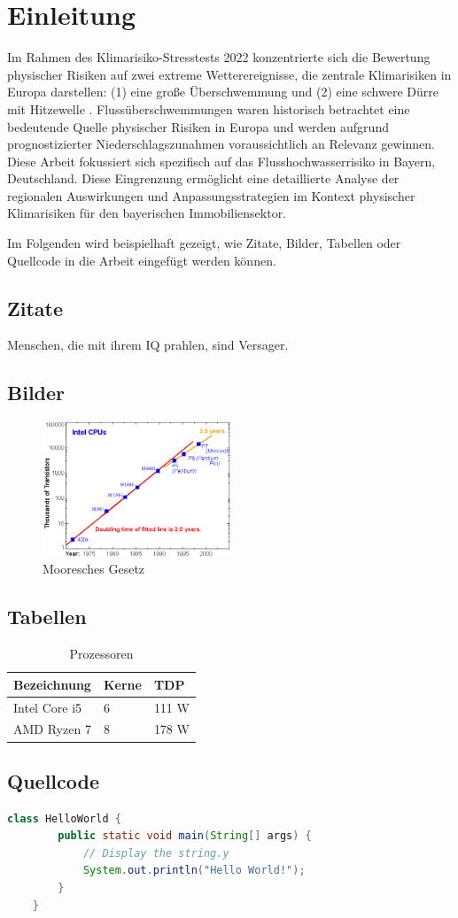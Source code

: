 \section{Einleitung}

Im Rahmen des Klimarisiko-Stresstests 2022 konzentrierte sich die Bewertung physischer Risiken auf zwei extreme Wetterereignisse, die zentrale Klimarisiken in Europa darstellen: (1) eine große Überschwemmung und (2) eine schwere Dürre mit Hitzewelle \parencite{ECB2022ClimateStressTest}. Flussüberschwemmungen waren historisch betrachtet eine bedeutende Quelle physischer Risiken in Europa und werden aufgrund prognostizierter Niederschlagszunahmen voraussichtlich an Relevanz gewinnen.
Diese Arbeit fokussiert sich spezifisch auf das Flusshochwasserrisiko in Bayern, Deutschland. Diese Eingrenzung ermöglicht eine detaillierte Analyse der regionalen Auswirkungen und Anpassungsstrategien im Kontext physischer Klimarisiken für den bayerischen Immobiliensektor.

Im Folgenden wird beispielhaft gezeigt, wie Zitate, Bilder, Tabellen oder Quellcode in die Arbeit eingefügt werden können.

\subsection{Zitate}
Menschen, die mit ihrem IQ prahlen, sind Versager.

\subsection{Bilder}
\begin{figure}[H] 
    \centering
    \includegraphics[width=0.5\textwidth]{figures/figure_example.png}
    \caption{Mooresches Gesetz}
\end{figure}

\subsection{Tabellen}
\begin{table}[H]
    \centering
    \begin{tabular}[H]{l|l|l}
        Bezeichnung & Kerne & TDP \\
        \hline
        Intel Core i5 & 6 & 111 W \\
        \hline
        AMD Ryzen 7 & 8 & 178 W \\
    \end{tabular}
    \caption{Prozessoren}
\end{table}


\subsection{Quellcode}
\begin{lstlisting}[language=java, caption=Hello World in Java, captionpos=b]
    class HelloWorld {
        public static void main(String[] args) {
            // Display the string.y
            System.out.println("Hello World!");
        }
    }
\end{lstlisting}
